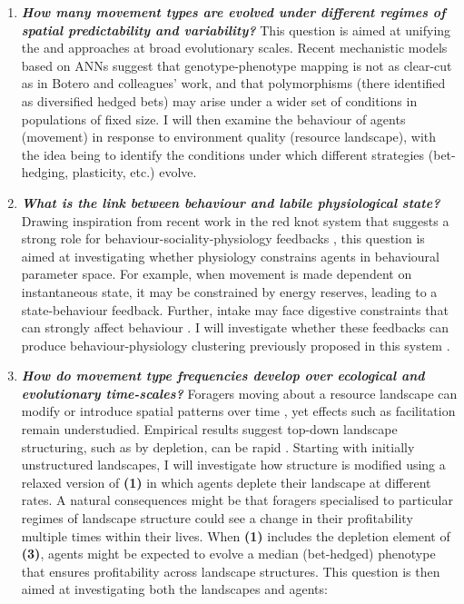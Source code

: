 \begin{enumerate}
\def\labelenumi{\arabic{enumi}.}
\item
  \textbf{\emph{How many movement types are evolved under different
  regimes of spatial predictability and variability?}} This question is
  aimed at unifying the \citet{wolf2010} and \citet{botero2015}
  approaches at broad evolutionary scales. Recent mechanistic models
  based on ANNs suggest that genotype-phenotype mapping is not as
  clear-cut as in Botero and colleagues' work, and that polymorphisms
  (there identified as diversified hedged bets) may arise under a wider
  set of conditions in populations of fixed size. I will then examine
  the behaviour of agents (movement) in response to environment quality
  (resource landscape), with the idea being to identify the conditions
  under which different strategies (bet-hedging, plasticity, etc.)
  evolve.
\item
  \textbf{\emph{What is the link between behaviour and labile
  physiological state?}} Drawing inspiration from recent work in the red
  knot system that suggests a strong role for
  behaviour-sociality-physiology feedbacks
  \citetext{\citealp{bijleveld2014}; \citealp{mathot2017}; \citealp{oudman2016}; \citealp[discussed
  in][]{wolf2010}}, this question is aimed at investigating whether
  physiology constrains agents in behavioural parameter space. For
  example, when movement is made dependent on instantaneous state, it
  may be constrained by energy reserves, leading to a state-behaviour
  feedback. Further, intake may face digestive constraints that can
  strongly affect behaviour \citep{vangils2004}. I will investigate
  whether these feedbacks can produce behaviour-physiology clustering
  previously proposed in this system \citep{bijleveld2015b}.
\item
  \textbf{\emph{How do movement type frequencies develop over ecological
  and evolutionary time-scales?}} Foragers moving about a resource
  landscape can modify or introduce spatial patterns over time
  \citep{dejager2011, getz2015, netz2017}, yet effects such as
  facilitation remain understudied. Empirical results suggest top-down
  landscape structuring, such as by depletion, can be rapid
  \citep{bijleveld2015}. Starting with initially unstructured
  landscapes, I will investigate how structure is modified using a
  relaxed version of \textbf{(1)} in which agents deplete their
  landscape at different rates. A natural consequences might be that
  foragers specialised to particular regimes of landscape structure
  could see a change in their profitability multiple times within their
  lives. When \textbf{(1)} includes the depletion element of
  \textbf{(3)}, agents might be expected to evolve a median (bet-hedged)
  phenotype that ensures profitability across landscape structures. This
  question is then aimed at investigating both the landscapes and
  agents:


\end{enumerate}
